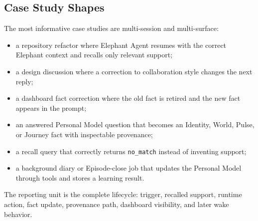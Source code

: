 \subsection{Case Study Shapes}

The most informative case studies are multi-session and multi-surface:

\begin{itemize}[leftmargin=*]
  \item a repository refactor where Elephant Agent resumes with the correct Elephant context
  and recalls only relevant support;
  \item a design discussion where a correction to collaboration style changes
  the next reply;
  \item a dashboard fact correction where the old fact is retired and the new
  fact appears in the prompt;
  \item an answered Personal Model question that becomes an Identity, World,
  Pulse, or Journey fact with inspectable provenance;
  \item a recall query that correctly returns \texttt{no\_match} instead of
  inventing support;
  \item a background diary or Episode-close job that updates the Personal Model
  through tools and stores a learning result.
\end{itemize}

The reporting unit is the complete lifecycle: trigger, recalled support,
runtime action, fact update, provenance path, dashboard visibility, and later
wake behavior.
